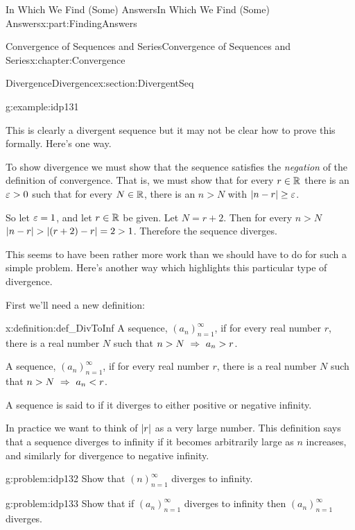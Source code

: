 \begin{partptx}{In Which We Find (Some) Answers}{}{In Which We Find (Some) Answers}{}{}{x:part:FindingAnswers}
\begin{chapterptx}{Convergence of Sequences and Series}{}{Convergence of Sequences and Series}{}{}{x:chapter:Convergence}
\begin{sectionptx}{Divergence}{}{Divergence}{}{}{x:section:DivergentSeq}
\begin{example}{}{g:example:idp131}
				\par
				This is clearly a divergent sequence but it may not be clear how to prove this formally. Here's one way.%
				\par
				To show divergence we must show that the sequence satisfies the \emph{negation} of the definition of convergence. That is, we must show that for every \(r\in\mathbb {R}\) there is an \(\varepsilon>0\) such that for every \(N\in\mathbb {R}\), there is an \(n>N\) with \(\left|n-r\right|\ge\varepsilon\).%
				\par
				So let \(\varepsilon=1\), and let \(r\in\mathbb {R}\) be given. Let \(N=r+2\). Then for every \(n>N\) \(\left|n-r\right| > \left|(r+2)-r\right|=2>1\). Therefore the sequence diverges.%
			\end{example}
			This seems to have been rather more work than we should have to do for such a simple problem. Here's another way which highlights this particular type of divergence.%
			\par
			First we'll need a new definition:%
			\begin{definition}{}{x:definition:def_DivToInf}%
				 A sequence, \(\left(a_n\right)_{n=1}^\infty\),  if for every real number \(r\), there is a real number \(N\) such that \(n>N\ \Rightarrow\  a_n>r\).%
				\par
				 A sequence, \(\left(a_n\right)_{n=1}^\infty\),  if for every real number \(r\), there is a real number \(N\) such that \(n>N\ \Rightarrow\  a_n< r\).%
				\par
				 A sequence is said to  if it diverges to either positive or negative infinity.%
			\end{definition}
			In practice we want to think of \(\left|r\right|\) as a very large number. This definition says that a sequence diverges to infinity if it becomes arbitrarily large as \(n\) increases, and similarly for divergence to negative infinity.%
			\begin{problem}{}{g:problem:idp132}%
				 Show that \(\left(n\right)_{n=1}^\infty\) diverges to infinity.%
			\end{problem}
			\begin{problem}{}{g:problem:idp133}%
				 Show that if \(\left(a_n\right)_{n=1}^\infty\) diverges to infinity then \(\left(a_n\right)_{n=1}^\infty\) diverges.%

\end{problem}
\end{sectionptx}
\end{chapterptx}
\end{partptx}
